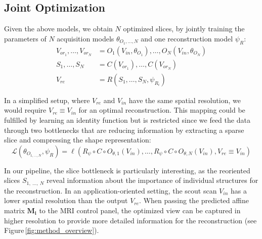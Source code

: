     \subsection{Joint Optimization}
     Given the above models, we obtain $N$ optimized slices, by jointly training the parameters of $N$ acquisition models $\theta_{O_1,\dots,N}$ and one reconstruction model $\psi_R$:
    \begin{align}
        V_{or_1},\dots,V_{or_N} &= O_1\left(V_{in},\theta_{O_1}\right),\dots, O_N\left(V_{in}, \theta_{O_N}\right) \label{eq:joint_slicing}\\
        S_1,\dots,S_N &= C\left(V_{or_1}\right), \dots, C\left(V_{or_N}\right)\\
        V_{re} &= R\left(S_{1},\dots,S_{N},\psi_{R_i}\right)\label{eq:joint_recon}
    \end{align}

   In a simplified setup, where $V_{re}$ and $V_{in}$ have the same spatial resolution, we would require $ V_{re} \equiv V_{in}$ for an optimal reconstruction.
    This mapping could be fulfilled by learning an identity function but is restricted since we feed the data through two bottlenecks that are reducing information by extracting a sparse slice and compressing the shape representation:
    \begin{equation}
         \mathcal{L}\left(\theta_{O_{1,\dots,N}}, \psi_R\right) = \ell\left(R_{\psi} \circ C \circ O_{\theta,1}\left(V_{in}\right),\dots, R_{\psi} \circ C \circ O_{\theta,N}\left(V_{in}\right), V_{re} \equiv V_{in}\right)\label{eq:loss}
    \end{equation}

    In our pipeline, the slice bottleneck is particularly interesting, as the reoriented slices $S_{1,~\dots,~N}$ reveal information about the importance of individual structures for the reconstruction.
    In an application-oriented setting, the scout scan $V_{in}$ has a lower spatial resolution than the output $V_{re}$.
    When passing the predicted affine matrix $\mathbf{M_i}$ to the MRI control panel, the optimized view can be captured in higher resolution to provide more detailed information for the reconstruction (see Figure\,\ref{fig:method_overview}).

